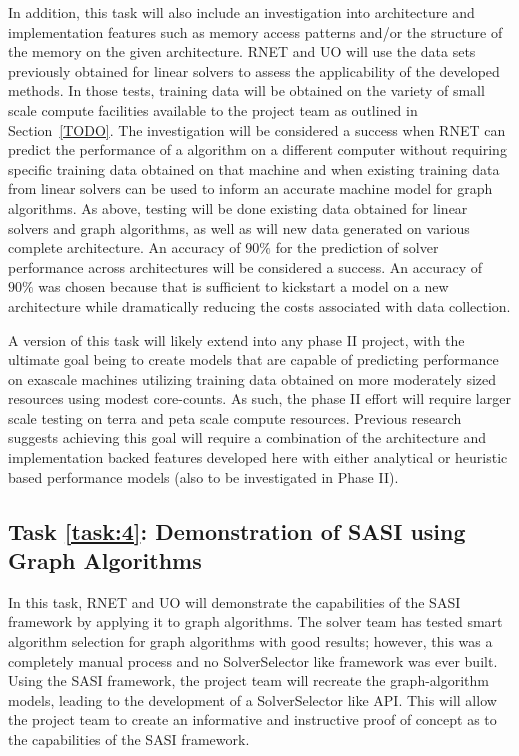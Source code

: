 In addition, this task will also include an investigation into architecture and implementation features such as memory access patterns and/or the structure of the memory on the given architecture. RNET and UO will use the data sets previously obtained for linear solvers to assess the applicability of the developed methods. In those tests, training data will be obtained on the variety of small scale compute facilities available to the project team as outlined in Section~\ref{TODO}. The investigation will be considered a success when RNET can predict the performance of a algorithm on a different computer without requiring specific training data obtained on that machine and when existing training data from linear solvers can be used to inform an accurate machine model for graph algorithms. As above, testing will be done existing data obtained for linear solvers and graph algorithms, as well as will new data generated on various complete architecture. An accuracy of $90\%$ for the prediction of solver performance across architectures will be considered a success. An accuracy of $90\%$ was chosen because that is sufficient to kickstart a model on a new architecture while dramatically reducing the costs associated with data collection. 

A version of this task will likely extend into any phase II project, with the ultimate goal being to create models that are capable of predicting performance on exascale machines utilizing training data obtained on more moderately sized resources using modest core-counts. As such, the phase II effort will require larger scale testing on terra and peta scale compute resources. Previous research suggests achieving this goal will require a combination of the architecture and implementation backed features developed here with either analytical or heuristic based performance models (also to be investigated in Phase II).  

\label{task:4}
\subsection{Task \ref{task:4}: Demonstration of SASI using Graph Algorithms }

In this task, RNET and UO will demonstrate the capabilities of the SASI framework by applying 
it to graph algorithms. The solver team has tested smart algorithm selection for graph algorithms 
with good results; however, this was a completely manual process and no SolverSelector like framework was ever built. Using 
the SASI framework, the project team will recreate the graph-algorithm models, leading to the development of a SolverSelector
like API. This will allow the project team to create an informative and instructive proof of concept as to the capabilities 
of the SASI framework. 

